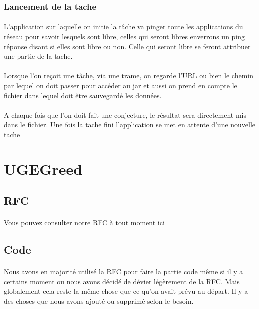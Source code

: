 \documentclass[a4paper,titlepage]{report}
\begin{document}
\subsubsection{Lancement de la tache}
\paragraph{}
L'application sur laquelle on initie la tâche va pinger toute les applications du réseau pour savoir lesquels sont libre, celles qui seront libres enverrons un ping réponse disant si elles sont libre ou non. Celle qui seront libre se feront attribuer une partie de la tache.
\paragraph{}
Lorsque l'on reçoit une tâche, via une trame, on regarde l'URL ou bien le chemin par lequel on doit passer pour accéder au jar  et aussi on prend en compte le fichier dans lequel doit être sauvegardé les données. 
\paragraph{}
A chaque fois que l'on doit fait une conjecture, le résultat sera directement mis dans le fichier. Une fois la tache fini l'application se met en attente d'une nouvelle tache
\pagebreak







\section{UGEGreed}
\subsection{RFC}
\paragraph{}
Vous pouvez consulter notre RFC à tout moment
\href {https://gitlab.com/Setsulys/ugegreed-debats-ly-ieng/-/blob/main/GreedRfc.md}{ici}
\subsection{Code}
\paragraph{}
Nous avons en majorité utilisé la RFC pour faire la partie code même si il y a certains moment ou nous avons décidé de dévier légèrement de la RFC. Mais globalement cela reste la même chose que ce qu'on avait prévu au départ. Il y a des choses que nous avons ajouté ou supprimé selon le besoin.
\end{document}
